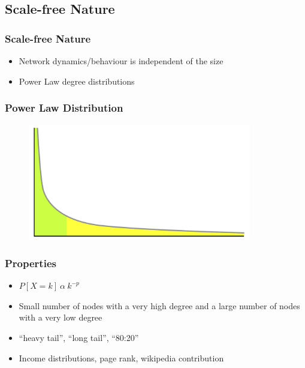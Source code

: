 \documentclass{beamer}
\begin{document}
	\subsection{Scale-free Nature}
		\frame
		{
			\frametitle{Scale-free Nature}
				\begin{itemize}
					\item<1-> {Network dynamics/behaviour is independent of the size}
					\item<2-> {Power Law degree distributions} 
				\end{itemize}
		}
		\frame
		{
			\frametitle{Power Law Distribution}
			\begin{centering}			
			\begin{figure}
				\includegraphics[height=2in]{Long_tail}
			\end{figure}
			\end{centering}					
					
		}
		\frame
		{
			\frametitle{Properties}
			\begin{itemize}
				\item<1-> {$P[X=k] \  \alpha \  k^{-p}$ }
				\item<2-> {Small number of nodes with a very high degree and a large number of nodes with a very low degree}
				\item<3-> {``heavy tail'', ``long tail'', ``80:20''}
				\item<4-> {Income distributions, page rank, wikipedia contribution}
			\end{itemize}
		}
\end{document}
